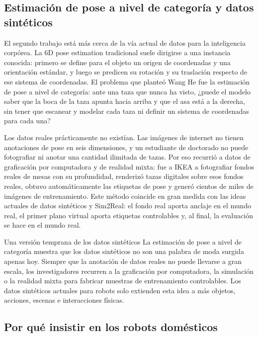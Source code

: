 \subsection{Estimación de pose a nivel de categoría y datos sintéticos}

El segundo trabajo está más cerca de la vía actual de datos para la inteligencia corpórea. La 6D pose estimation tradicional suele dirigirse a una instancia conocida: primero se define para el objeto un origen de coordenadas y una orientación estándar, y luego se predicen su rotación y su traslación respecto de ese sistema de coordenadas. El problema que planteó Wang He fue la estimación de pose a nivel de categoría: ante una taza que nunca ha visto, ¿puede el modelo saber que la boca de la taza apunta hacia arriba y que el asa está a la derecha, sin tener que escanear y modelar cada taza ni definir un sistema de coordenadas para cada una?

Los datos reales prácticamente no existían. Las imágenes de internet no tienen anotaciones de pose en seis dimensiones, y un estudiante de doctorado no puede fotografiar ni anotar una cantidad ilimitada de tazas. Por eso recurrió a datos de graficación por computadora y de realidad mixta: fue a IKEA a fotografiar fondos reales de mesas con su profundidad, renderizó tazas digitales sobre esos fondos reales, obtuvo automáticamente las etiquetas de pose y generó cientos de miles de imágenes de entrenamiento. Este método coincide en gran medida con las ideas actuales de datos sintéticos y Sim2Real: el fondo real aporta anclaje en el mundo real, el primer plano virtual aporta etiquetas controlables y, al final, la evaluación se hace en el mundo real.

\begin{importantbox}{Una versión temprana de los datos sintéticos}
La estimación de pose a nivel de categoría muestra que los datos sintéticos no son una palabra de moda surgida apenas hoy. Siempre que la anotación de datos reales no puede llevarse a gran escala, los investigadores recurren a la graficación por computadora, la simulación o la realidad mixta para fabricar muestras de entrenamiento controlables. Los datos sintéticos actuales para robots solo extienden esta idea a más objetos, acciones, escenas e interacciones físicas.
\end{importantbox}

\subsection{Por qué insistir en los robots domésticos}

